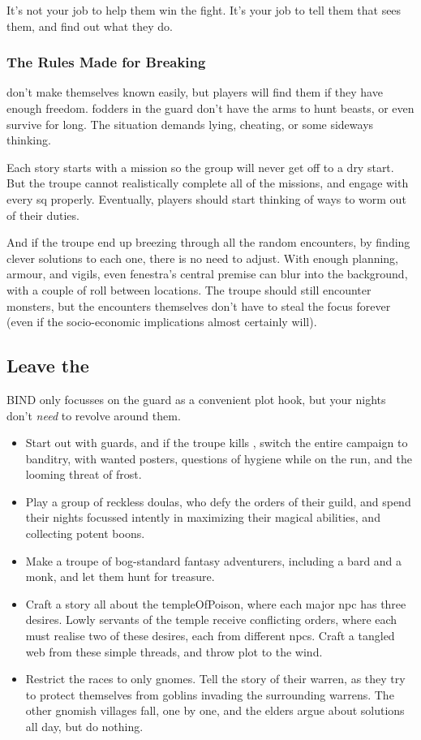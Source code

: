 \begin{multicols}{2}
It's not your job to help them win the fight.
It's your job to tell them that  sees them, and find out what they do.

\subsubsection{The Rules Made for Breaking}
don't make themselves known easily, but players will find them if they have enough freedom.
\Glspl{fodder} in the \gls{guard} don't have the arms to hunt beasts, or even survive for long.
The situation demands lying, cheating, or some sideways thinking.

Each story starts with a mission so the group will never get off to a dry start.
But the troupe cannot realistically complete all of the missions, and engage with every \gls{sq} properly.
Eventually, players should start thinking of ways to worm out of their duties.

And if the troupe end up breezing through all the random encounters, by finding clever solutions to each one, there is no need to adjust.
With enough planning, armour, and \glspl{vigil}, even \gls{fenestra}'s central premise can blur into the background, with a couple of roll between locations.
The troupe should still encounter \glspl{monster}, but the encounters themselves don't have to steal the focus forever (even if the socio-economic implications almost certainly will).

\subsection{Leave the }
BIND only focusses on the \gls{guard} as a convenient plot hook, but your nights don't \emph{need} to revolve around them.

\begin{itemize}
  \item
  Start out with \glspl{guard}, and if the troupe kills , switch the entire \gls{campaign} to banditry, with wanted posters, questions of hygiene while on the run, and the looming threat of frost.
  \item
  Play a group of reckless \glspl{doula}, who defy the orders of their guild, and spend their nights focussed intently in maximizing their magical abilities, and collecting potent \glspl{boon}.
  \item
  Make a troupe of bog-standard fantasy adventurers, including a bard and a monk, and let them hunt for treasure.
  \item
  Craft a story all about the \gls{templeOfPoison}, where each major \gls{npc} has three desires.
  Lowly servants of the temple receive conflicting orders, where each must realise two of these desires, each from different \glspl{npc}.
  Craft a tangled web from these simple threads, and throw plot to the wind.
  \item
  Restrict the races to only gnomes.
  Tell the story of their warren, as they try to protect themselves from goblins invading the surrounding warrens.
  The other gnomish villages fall, one by one, and the elders argue about solutions all day, but do nothing.
\end{itemize}


\end{multicols}

